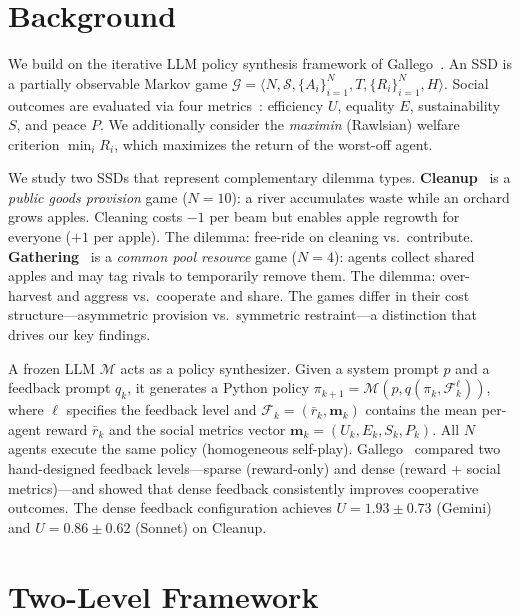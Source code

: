 \documentclass[10pt,twocolumn]{article}
\newcommand{\cM}{\mathcal{M}}
\newcommand{\cG}{\mathcal{G}}
\newcommand{\bm}{\mathbf{m}}
\begin{document}
\section{Background}

We build on the iterative LLM policy synthesis framework of Gallego~\cite{gallego2026}. An SSD is a partially observable Markov game $\cG = \langle N, \mathcal{S}, \{A_i\}_{i=1}^{N}, T, \{R_i\}_{i=1}^{N}, H \rangle$. Social outcomes are evaluated via four metrics~\cite{perolat2017}: efficiency $U$, equality $E$, sustainability $S$, and peace $P$. We additionally consider the \emph{maximin} (Rawlsian) welfare criterion $\min_i R_i$, which maximizes the return of the worst-off agent.

We study two SSDs that represent complementary dilemma types. \textbf{Cleanup}~\cite{hughes2018} is a \emph{public goods provision} game ($N{=}10$): a river accumulates waste while an orchard grows apples. Cleaning costs $-1$ per beam but enables apple regrowth for everyone ($+1$ per apple). The dilemma: free-ride on cleaning vs.\ contribute. \textbf{Gathering}~\cite{leibo2017,perolat2017} is a \emph{common pool resource} game ($N{=}4$): agents collect shared apples and may tag rivals to temporarily remove them. The dilemma: over-harvest and aggress vs.\ cooperate and share. The games differ in their cost structure---asymmetric provision vs.\ symmetric restraint---a distinction that drives our key findings.

A frozen LLM $\cM$ acts as a policy synthesizer. Given a system prompt $p$ and a feedback prompt $q_k$, it generates a Python policy $\pi_{k+1} = \cM(p, q(\pi_k, \mathcal{F}_k^\ell))$, where $\ell$ specifies the feedback level and $\mathcal{F}_k = (\bar{r}_k, \bm_k)$ contains the mean per-agent reward $\bar{r}_k$ and the social metrics vector $\bm_k = (U_k, E_k, S_k, P_k)$. All $N$ agents execute the same policy (homogeneous self-play). Gallego~\cite{gallego2026} compared two hand-designed feedback levels---sparse (reward-only) and dense (reward + social metrics)---and showed that dense feedback consistently improves cooperative outcomes. The dense feedback configuration achieves $U{=}1.93{\pm}0.73$ (Gemini) and $U{=}0.86{\pm}0.62$ (Sonnet) on Cleanup.

\section{Two-Level Framework}
\end{document}

